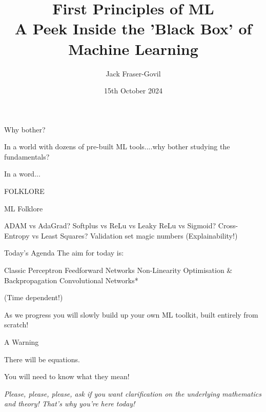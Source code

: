 \documentclass[]{SangerLibrary/sanger-present}
\title{\LARGE First Principles of ML\\ {\footnotesize A Peek Inside the 'Black Box' of Machine Learning}}
\author{\large Jack Fraser-Govil}
\institute{The Wellcome Sanger Institute, Hinxton, UK}
\date{\small 15th October 2024}
\begin{document}
	\maketitlepage


	\begin{frame}{Why bother?}

		In a world with dozens of pre-built ML tools....why bother studying the fundamentals?

		\pause In a word...
		\pause\begin{center}
			\LARGE FOLKLORE
		\end{center}
	\end{frame}
	\begin{frame}{ML Folklore}
		\begin{itemize}
			\pitem ADAM vs AdaGrad?
			\pitem Softplus vs ReLu vs Leaky ReLu vs Sigmoid?
			\pitem Cross-Entropy vs Least Squares?
			\pitem Validation set magic numbers
			\pitem (Explainability!) 
		\end{itemize}
	\end{frame}

	\begin{frame}{Today's Agenda}
		The aim for today is:

		\begin{itemize}
			\pitem Classic Perceptron
			\pitem Feedforward Networks
			\pitem Non-Linearity
			\pitem Optimisation \& Backpropagation
			\pitem Convolutional Networks*
		\end{itemize}
		(\small * Time dependent!)

		\pause As we progress you will slowly build up your own ML toolkit, built entirely from scratch! 

	\end{frame}

	\newcounter{custompart}
	\setcounter{custompart}{0}
	\newcommand\partFrame[1]
	{
		\stepcounter{custompart}
		\begin{frame}{}
			\begin{center}
				\Wellcome \huge Part \thecustompart

				#1
			\end{center}
		\end{frame}
	}
	
	\begin{frame}{A Warning}
		
		\begin{center}
			{\Large There will be equations.}
			
			{\pause \Large You will need to know what they mean!}

			{\pause \it Please, please, please, ask if you want clarification on the underlying mathematics and theory! That's why you're here today!} 
		\end{center}
	\end{frame}
\end{document}
